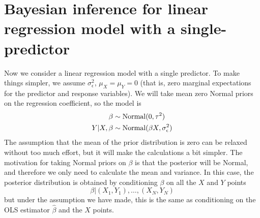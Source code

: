 \section{Bayesian inference for linear regression model with a single-predictor}\label{sec:bayeslr}
Now we consider a linear regression model with a single predictor. To make things simpler, we assume $\sigma_{\epsilon}^2$, $\mu_X = \mu_Y =0$ (that is, zero marginal expectations for the predictor and response variables). We will take mean zero Normal priors on the regression coefficient, so the model is 
\begin{align}
\beta &\sim {\rm Normal}(0,\tau^2)\\
Y|X,\beta &\sim {\rm Normal}(\beta X,\sigma_{\epsilon}^2)
\end{align}
The assumption that the mean of the prior distribution is zero can be relaxed without too much effort, but it will make the calculations a bit simpler. 
The motivation for taking Normal priors on $\beta$ is that the posterior will be Normal, and therefore we only need to calculate the mean and variance. In this case, the posterior distribution is obtained by conditioning $\beta$ on all the $X$ and $Y$ points 
\begin{equation}
\beta|(X_1,Y_1),\dots,(X_N,Y_N)
\end{equation}
but under the assumption we have made, this is the same as conditioning on the OLS estimator $\hat{\beta}$ and the $X$ points. 

